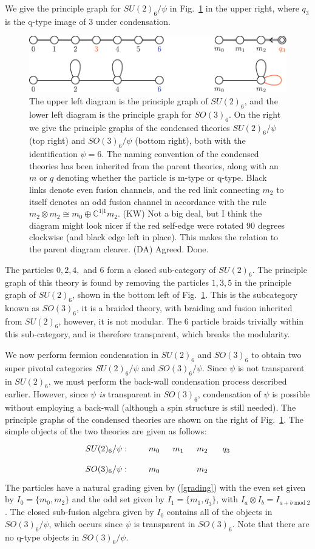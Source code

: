 \documentclass[12pt,a4paper]{article}
\newcommand{\tp}{\otimes}
\newcommand{\cc}{\mathbb{C}}
\newcommand{\kw}[1]{{\color{kwcolor}\footnotesize{(KW) #1}}}
\newcommand{\dave}[1]{{\color{ao(english)}\footnotesize{(DA) #1}}}
\begin{document}
We give the principle graph for $SU(2)_6/\psi$ in Fig.~\ref{SUSOsix} in the upper right, where $q_3$ is the q-type image of $3$ under condensation.
\begin{figure} 
\centering
\includegraphics{SU26SO36Dynkin.pdf}
\caption{\label{SUSOsix} The upper left diagram is the principle graph of $SU(2)_6$, and the 
lower left diagram is the principle graph for $SO(3)_6$. 
On the right we give the principle graphs of the condensed theories $SU(2)_6/\psi$ (top right) and 
$SO(3)_6/\psi$ (bottom right), both with the identification $\psi=6$. 
The naming convention of the condensed theories has been inherited from the parent theories, 
along with an $m$ or $q$ denoting whether the particle is m-type or q-type.
Black links denote even fusion channels, and the red link connecting $m_2$ to itself 
denotes an odd fusion channel in accordance with the rule $m_2\tp m_2 \cong m_0 \oplus \cc^{1|1}m_2$. 
\kw{Not a big deal, but I think the diagram might look nicer if the red self-edge were rotated 90 degrees clockwise (and
black edge left in place).
This makes the relation to the parent diagram clearer.}
\dave{Agreed. Done.}
}
\end{figure}
The particles $0,2,4,$ and $6$ form a closed sub-category of $SU(2)_6$. 
The principle graph of this theory is found by removing the particles $1,3,5$ in the principle graph of $SU(2)_6$, shown in the bottom left of Fig.~\ref{SUSOsix}. 
This is the subcategory known as $SO(3)_6$, it is a braided theory, with braiding and fusion inherited from $SU(2)_6$, however, it is not modular.
The $6$ particle braids trivially within this sub-category, and is therefore transparent, which breaks the modularity.

We now perform fermion condensation in $SU(2)_6$ and $SO(3)_6$ to obtain two super pivotal categories $SU(2)_6/\psi$ and $SO(3)_6/\psi$. 
Since $\psi$ is not transparent in $SU(2)_6$, we must perform the back-wall condensation process described earlier. 
However, since $\psi$ {\it is} transparent in $SO(3)_6$, condensation of $\psi$ is possible without employing a back-wall (although a spin structure is still needed). 
The principle graphs of the condensed theories are shown on the right of Fig.~\ref{SUSOsix}.
The simple objects of the two theories are given as follows:
\begin{align}
\xymatrix @!0 @M=1mm @C=10mm {
SU(2)_6/\psi:&&m_0 & m_1 & m_2 & q_3 \\
SO(3)_6/ \psi:&&m_0 && m_2& 
}
\end{align}
The particles have a natural grading given by (\ref{grading}) with the even set given by $I_0 = \{ m_0, m_2 \}$ and the odd set given by $I_1 = \{m_1, q_3\}$, with $I_a \tp I_b = I_{a+b \;  \text{mod} \; 2}$.
The closed sub-fusion algebra given by $I_0$ contains all of the objects in $SO(3)_6/\psi$, 
which occurs since $\psi$ is transparent in $SO(3)_6$. 
Note that there are no q-type objects in $SO(3)_6/\psi$. 
\end{document}

